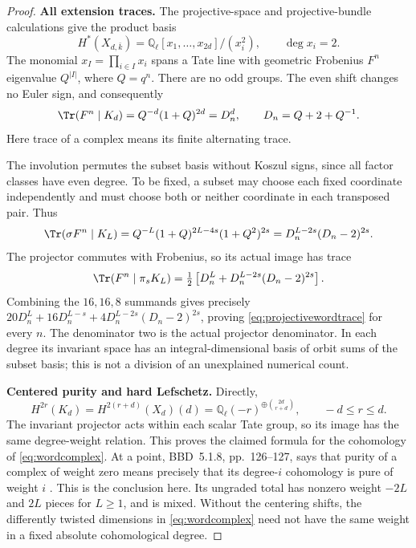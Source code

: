 \documentclass[11pt,a4paper]{article}
\newcommand{\Q}{\mathbb Q}\newcommand{\Z}{\mathbb Z}\newcommand{\C}{\mathbb C}\newcommand{\N}{\mathbb N}\newcommand{\F}{\mathbb F}
\theoremstyle{named}\newtheorem{finding}{Finding}[section]
\theoremstyle{definition}\newtheorem{definition}[finding]{Definition}
\theoremstyle{remark}\newtheorem{remark}[finding]{Remark}
\begin{document}
\begin{proof}
\par\smallskip\noindent\textbf{All extension traces.}\quad
The projective-space and projective-bundle calculations
\cite[Example~16.3, p.~109; Theorem~23.2, pp.~139--140]{Milne}
give the product basis
\[
 H^*(X_{d,\bar k})=\Q_\ell[x_1,\ldots,x_{2d}]/(x_i^2),
 \qquad \deg x_i=2.
\]
The monomial $x_I=\prod_{i\in I}x_i$ spans a Tate line with
geometric Frobenius $F^n$ eigenvalue $Q^{|I|}$, where $Q=q^n$.
There are no odd groups. The even shift changes no Euler sign,
and consequently
\[
 \Tr(F^n\mid K_d)=Q^{-d}(1+Q)^{2d}=D_n^d,
 \qquad D_n=Q+2+Q^{-1}.
\]
Here trace of a complex means its finite alternating trace.

The involution permutes the subset basis without Koszul signs,
since all factor classes have even degree. To be fixed, a subset
may choose each fixed coordinate independently and must choose
both or neither coordinate in each transposed pair. Thus
\[
 \Tr(\sigma F^n\mid K_L)
   =Q^{-L}(1+Q)^{2L-4s}(1+Q^2)^{2s}
   =D_n^{L-2s}(D_n-2)^{2s}.
\]
The projector commutes with Frobenius, so its actual image has trace
\[
 \Tr(F^n\mid\pi_sK_L)
   =\tfrac12\left[D_n^L+D_n^{L-2s}(D_n-2)^{2s}\right].
\]
Combining the $16,16,8$ summands gives precisely
$20D_n^L+16D_n^{L-s}+4D_n^{L-2s}(D_n-2)^{2s}$,
proving \eqref{eq:projectivewordtrace} for every $n$.
The denominator two is the actual projector denominator.
In each degree its invariant space has an integral-dimensional
basis of orbit sums of the subset basis; this is not a division
of an unexplained numerical count.

\par\smallskip\noindent\textbf{Centered purity and hard Lefschetz.}\quad
Directly,
\[
 H^{2r}(K_d)=H^{2(r+d)}(X_d)(d)
   =\Q_\ell(-r)^{\oplus\binom{2d}{r+d}},\qquad -d\le r\le d.
\]
The invariant projector acts within each scalar Tate group, so
its image has the same degree-weight relation. This proves the
claimed formula for the cohomology of \eqref{eq:wordcomplex}.
At a point, BBD~5.1.8, pp.~126--127, says that purity of a
complex of weight zero means precisely that its degree-$i$
cohomology is pure of weight $i$ \cite{BBD}.
This is the conclusion here. Its ungraded total has nonzero
weight $-2L$ and $2L$ pieces for $L\ge1$, and is mixed.
Without the centering shifts, the differently twisted dimensions
in \eqref{eq:wordcomplex} need not have the same weight in a
fixed absolute cohomological degree.


\end{proof}
\end{document}
